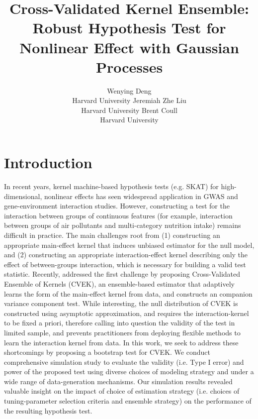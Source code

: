\documentclass[article]{jss}
\author{Wenying Deng\\Harvard University
   \And Jeremiah Zhe Liu\\Harvard University
   \And Brent Coull\\Harvard University}
\title{Cross-Validated Kernel Ensemble: Robust Hypothesis Test for Nonlinear Effect
with Gaussian Processes}
\begin{document}


\section[Introduction]{Introduction} \label{sec:intro}

In recent years, kernel machine-based hypothesis tests (e.g. SKAT) for high-dimensional, nonlinear effects has seen widespread application in GWAS and gene-environment interaction studies. However, constructing a test for the interaction between groups of continuous features (for example, interaction between groups of air pollutants and multi-category nutrition intake) remains difficult in practice. The main challenges root from (1) constructing an appropriate main-effect kernel that induces unbiased estimator for the null model, and (2) constructing an appropriate interaction-effect kernel describing only the effect of between-groups interaction, which is necessary for building a valid test statistic. Recently, \citep{liu_robust_2017} addressed the first challenge by proposing Cross-Validated Ensemble of Kernels (CVEK), an ensemble-based estimator that adaptively learns the form of the main-effect kernel from data, and constructs an companion variance component test. While interesting, the null distribution of CVEK is constructed using asymptotic approximation, and requires the interaction-kernel to be fixed a priori, therefore calling into question the validity of the test in limited sample, and prevents practitioners from deploying flexible methods to learn the interaction kernel from data. In this work, we seek to address these shortcomings by proposing a bootstrap test for CVEK. We conduct comprehensive simulation study to evaluate the validity (i.e. Type I error) and power of the proposed test using diverse choices of modeling strategy and under a wide range of data-generation mechanisms. Our simulation results revealed valuable insight on the impact of choice of estimation strategy (i.e. choices of tuning-parameter selection criteria and ensemble strategy) on the performance of the resulting hypothesis test.
\end{document}
